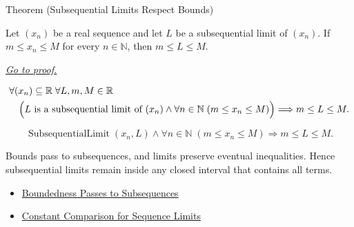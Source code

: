 \begin{theorembox}{Theorem (Subsequential Limits Respect Bounds)}
\begin{theorem}
\label{thm:subsequential-limits-respect-bounds}
Let $(x_n)$ be a real sequence and let $L$ be a subsequential limit of
$(x_n)$. If $m\le x_n\le M$ for every $n\in\mathbb{N}$, then
$m\le L\le M$.

\smallskip
\noindent
\hyperref[prf:subsequential-limits-respect-bounds]{\textit{Go to proof.}}
\end{theorem}
\end{theorembox}

\begin{remark*}
\[
\begin{aligned}
&\forall (x_n)\subseteq\mathbb{R}\;\forall L,m,M\in\mathbb{R}\\
&\quad\Bigl(
  L\text{ is a subsequential limit of }(x_n)
  \land
  \forall n\in\mathbb{N}\;(m\le x_n\le M)
\Bigr)
\Longrightarrow
m\le L\le M.
\end{aligned}
\]
\end{remark*}

\begin{remark*}
\[
\operatorname{SubsequentialLimit}(x_n,L)
\land
\forall n\in\mathbb{N}\;(m\le x_n\le M)
\Longrightarrow
m\le L\le M.
\]
\end{remark*}

\begin{remark*}[Interpretation]
Bounds pass to subsequences, and limits preserve eventual inequalities. Hence
subsequential limits remain inside any closed interval that contains all terms.
\end{remark*}

\begin{dependencies}
\begin{itemize}
  \item \hyperref[thm:boundedness-passes-to-subsequences]{Boundedness Passes to Subsequences}
  \item \hyperref[thm:constant-comparison-for-sequence-limits]{Constant Comparison for Sequence Limits}
\end{itemize}
\end{dependencies}


